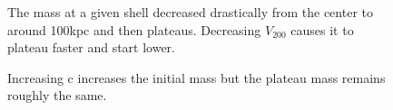 \documentclass[twocolumn,11pt]{article}
\begin{document}
\begin{figure}[!h]
	\centering
	\noindent
      \caption{The mass at a given shell decreased drastically from the center to around 100kpc and then plateaus. Decreasing $V_{200}$ causes it to plateau faster and start lower.}
\end{figure}
\begin{figure}[!h]
	\centering
	\noindent
      \caption{Increasing c increases the initial mass but the plateau mass remains roughly the same.}
\end{figure}
\end{document}
